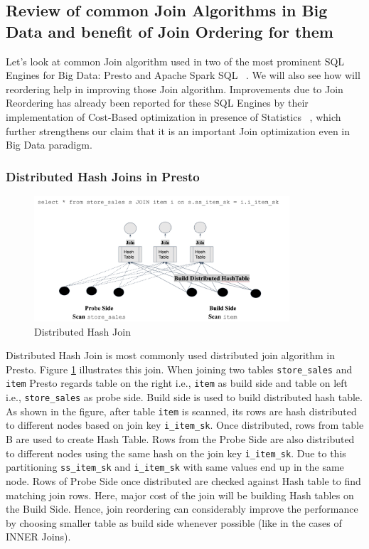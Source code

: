 \subsection{Review of common Join Algorithms in Big Data and benefit of Join Ordering for them}
Let's look at common Join algorithm used in two of the most prominent SQL Engines for Big Data: Presto and Apache Spark SQL ~\cite{b13}. We will also see how will reordering help in improving those Join algorithm. Improvements due to Join Reordering has already been reported for these SQL Engines by their implementation of Cost-Based optimization in presence of Statistics ~\cite{b2}, which further strengthens our claim that it is an important Join optimization even in Big Data paradigm.

\subsubsection{Distributed Hash Joins in Presto}

\begin{figure}[ht]
    \centerline{\includegraphics[width=9.5cm]{fig/DistributedHashJoin.png}}
    \caption{Distributed Hash Join}
    \label{distributed_hash_join}
\end{figure}

Distributed Hash Join is most commonly used distributed join algorithm in Presto.
Figure \ref{distributed_hash_join} illustrates this join.
When joining two tables \texttt{store\_sales} and \texttt{item} Presto regards table on the right i.e., \texttt{item} as build side and table on left i.e., \texttt{store\_sales} as probe side.
Build side is used to build distributed hash table. As shown in the figure, after table \texttt{item} is scanned, its rows are hash distributed to different nodes based on join key \texttt{i\_item\_sk}. Once distributed, rows from table B are used to create Hash Table. Rows from the Probe Side are also distributed to different nodes using the same hash on the join key \texttt{i\_item\_sk}. Due to this partitioning \texttt{ss\_item\_sk}  and \texttt{i\_item\_sk} with same values end up in the same node.  Rows of Probe Side once distributed are checked against Hash table to find matching join rows. Here, major cost of the join will be building Hash tables on the Build Side. Hence, join reordering can considerably improve the performance by choosing smaller table as build side whenever possible (like in the cases of INNER Joins).

